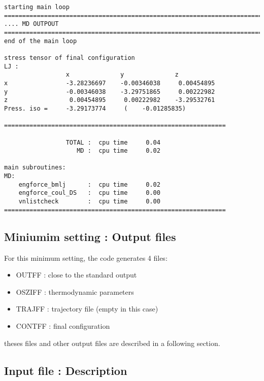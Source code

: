 \documentclass[a4paper]{article}
\begin{document}
\begin{verbatim}
starting main loop
=====================================================================================================================================
.... MD OUTPOUT
=====================================================================================================================================
end of the main loop
 
stress tensor of final configuration
LJ : 
                 x              y              z
x                -3.28236697    -0.00346038     0.00454895
y                -0.00346038    -3.29751865     0.00222982
z                 0.00454895     0.00222982    -3.29532761
Press. iso =     -3.29173774     (    -0.01285835)

=============================================================

                 TOTAL :  cpu time     0.04
                    MD :  cpu time     0.02

main subroutines:
MD:
    engforce_bmlj      :  cpu time     0.02
    engforce_coul_DS   :  cpu time     0.00
    vnlistcheck        :  cpu time     0.00
=============================================================
\end{verbatim}

\subsection{Miniumim setting : Output files}
For this minimum setting, the code generates 4 files:

\begin{itemize}
\item OUTFF  : close to the standard output
\item OSZIFF : thermodynamic parameters 
\item TRAJFF : trajectory file (empty in this case) 
\item CONTFF : final configuration
\end{itemize}
theses files and other output files are described in a following section.

\subsection{Input file : Description}

\end{document}
